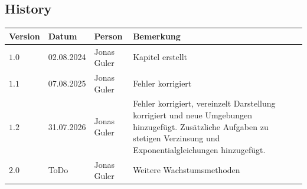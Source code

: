 \documentclass[11pt,oneside]{article}
\begin{document}
\newpage
\subsection*{History}
\begin{table}[H]
	\centering
	\begin{tabular}{|p{13mm}|p{20mm}|p{30mm}|p{70mm}|}\hline
		Version & Datum & Person & Bemerkung \\\hline
		$1.0$ & 02.08.2024 & Jonas Guler & Kapitel erstellt \\\hline
		$1.1$ & 07.08.2025 & Jonas Guler & Fehler korrigiert \\\hline
		$1.2$ & 31.07.2026 & Jonas Guler & Fehler korrigiert, vereinzelt Darstellung korrigiert und neue Umgebungen hinzugefügt. Zusätzliche Aufgaben zu stetigen Verzinsung und Exponentialgleichungen hinzugefügt. \\\hline
		$2.0$ & ToDo & Jonas Guler & Weitere Wachstumsmethoden \\\hline
	\end{tabular}
\end{table}
\end{document}
